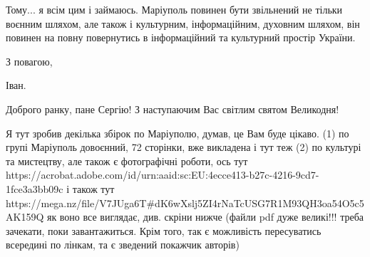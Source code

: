 Тому... я всім цим і займаюсь. Маріуполь повинен бути звільнений не тільки
воєнним шляхом, але також і культурним, інформаційним, духовним шляхом, він
повинен на повну повернутись в інформаційний та культурний простір України. 

З повагою,

Іван.


Доброго ранку, пане Сергію! З наступаючим Вас світлим святом Великодня!

Я тут зробив декілька збірок по Маріуполю, думав, це Вам буде цікаво. (1) по групі Маріуполь
довоєнний, 72 сторінки, вже викладена і тут теж (2) по культурі та мистецтву, але також є фотографічні роботи,
ось тут https://acrobat.adobe.com/id/urn:aaid:sc:EU:4ecce413-b27c-4216-9cd7-1fce3a3bb09c
і також тут https://mega.nz/file/V7JUga6T#dK6wXslj5ZI4rNaTcUSG7R1M93QH3oa54O5c5AK159Q
як воно все виглядає, див. скріни нижче (файли pdf дуже великі!!! треба зачекати, поки завантажиться. Крім того,
так є можливість пересуватись всередині по лінкам, та є зведений покажчик авторів)
